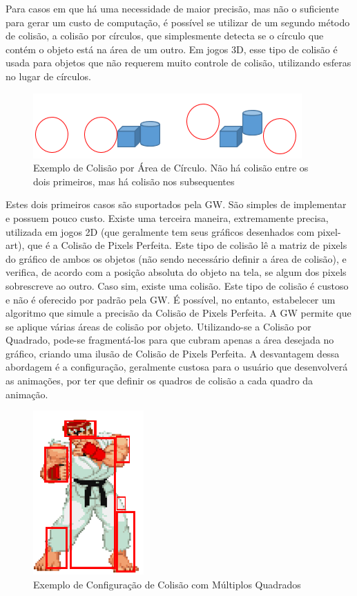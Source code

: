 \documentclass[
	12pt,				%
	openright,			%
	oneside,			%
	a4paper,			%
	brazil,				%
	]{abntex2}
\begin{document}
Para casos em que há uma necessidade de maior precisão, mas não o suficiente para gerar um custo de computação, é possível se utilizar de um segundo método de colisão, a colisão por círculos, que simplesmente detecta se o círculo que contém o objeto está na área de um outro. Em jogos 3D, esse tipo de colisão é usada para objetos que não requerem muito controle de colisão, utilizando esferas no lugar de círculos.

\begin{figure}
\centering
\includegraphics{colisao_esfera.png}
\caption{Exemplo de Colisão por Área de Círculo. Não há colisão entre os dois primeiros, mas há colisão nos subsequentes}
\label{fig:colisaoEsfera}
\end{figure}

Estes dois primeiros casos são suportados pela GW. São simples de implementar e possuem pouco custo. Existe uma terceira maneira, extremamente precisa, utilizada em jogos 2D (que geralmente tem seus gráficos desenhados com pixel-art), que é a Colisão de Pixels Perfeita. Este tipo de colisão lê a matriz de pixels do gráfico de ambos os objetos (não sendo necessário definir a área de colisão), e verifica, de acordo com a posição absoluta do objeto na tela, se algum dos pixels sobrescreve ao outro. Caso sim, existe uma colisão. Este tipo de colisão é custoso e não é oferecido por padrão pela GW. É possível, no entanto, estabelecer um algoritmo que simule a precisão da Colisão de Pixels Perfeita. A GW permite que se aplique várias áreas de colisão por objeto. Utilizando-se a Colisão por Quadrado, pode-se fragmentá-los para que cubram apenas a área desejada no gráfico, criando uma ilusão de Colisão de Pixels Perfeita. A desvantagem dessa abordagem é a configuração, geralmente custosa para o usuário que desenvolverá as animações, por ter que definir os quadros de colisão a cada quadro da animação.

\begin{figure}
\centering
\includegraphics{multipla_colisao.png}
\caption{Exemplo de Configuração de Colisão com Múltiplos Quadrados}
\label{fig:colisaoMultipla}
\end{figure}
\end{document}
